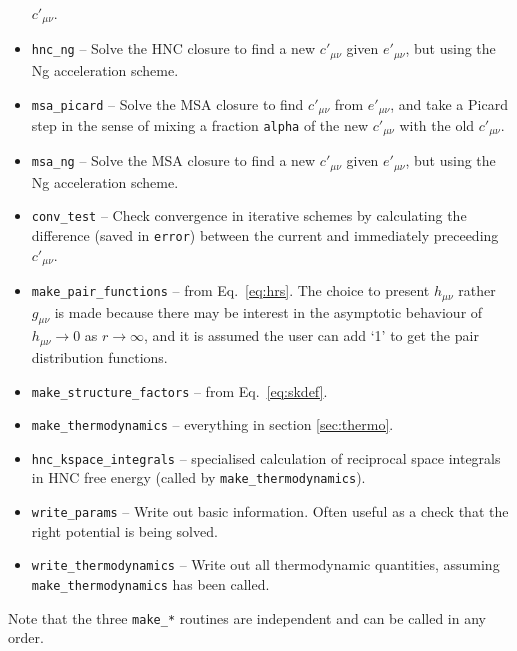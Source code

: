 \documentclass[12pt,a4paper]{article}
\newcommand{\Eqref}[1]{Eq.~\eqref{#1}}
\begin{document}
\begin{itemize}
  $c'_{\mu\nu}$.
%
\item\verb+hnc_ng+ -- Solve the HNC closure to find a new
$c'_{\mu\nu}$ given $e'_{\mu\nu}$, but using the Ng acceleration scheme.
%
\item\verb+msa_picard+ -- Solve the MSA closure to find $c'_{\mu\nu}$
  from $e'_{\mu\nu}$, and take a Picard step in the sense of mixing a
  fraction \verb+alpha+ of the new $c'_{\mu\nu}$ with the old
  $c'_{\mu\nu}$.
%
\item\verb+msa_ng+ -- Solve the MSA closure to find a new
$c'_{\mu\nu}$ given $e'_{\mu\nu}$, but using the Ng acceleration scheme.
%
\item\verb+conv_test+ -- Check convergence in iterative schemes by
  calculating the difference (saved in \verb+error+) between the
  current and immediately preceeding $c'_{\mu\nu}$.
%
\item\verb+make_pair_functions+ -- from \Eqref{eq:hrs}.  The
  choice to present $h_{\mu\nu}$ rather $g_{\mu\nu}$ is made because
  there may be interest in the asymptotic behaviour of
  $h_{\mu\nu}\to0$ as $r\to\infty$, and it is assumed the user can add
  `1' to get the pair distribution functions.
%
\item\verb+make_structure_factors+ -- from \Eqref{eq:skdef}.
%
\item\verb+make_thermodynamics+ -- everything in section
  \ref{sec:thermo}.
%
\item\verb+hnc_kspace_integrals+ -- specialised calculation of
  reciprocal space integrals in HNC free energy (called
  by \verb+make_thermodynamics+).
%
\item\verb+write_params+ -- Write out basic information.  Often useful
  as a check that the right potential is being solved.
%
\item\verb+write_thermodynamics+ -- Write out all thermodynamic
  quantities, assuming \verb+make_thermodynamics+ has been called.
%
\end{itemize}
%
Note that the three \verb+make_*+ routines are independent and can be
called in any order.
\end{document}
